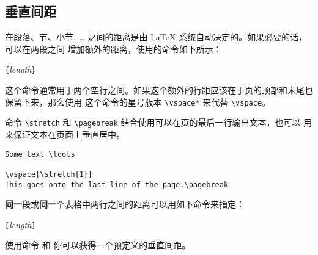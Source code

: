\subsection{垂直间距}
在段落、节、小节…… 之间的距离是由 \LaTeX{} 系统自动决定的。如果必要的话，可以在两段之间
增加额外的距离，使用的命令如下所示：
\begin{lscommand}
\verb|{|\emph{length}\verb|}|
\end{lscommand}

这个命令通常用于两个空行之间。如果这个额外的行距应该在于页的顶部和末尾也保留下来，那么使用
这个命令的星号版本 \verb|\vspace*| 来代替 \verb|\vspace|。

命令 \verb|\stretch| 和 \verb|\pagebreak| 结合使用可以在页的最后一行输出文本，也可以
用来保证文本在页面上垂直居中。
\begin{code}
\begin{verbatim}
Some text \ldots

\vspace{\stretch{1}}
This goes onto the last line of the page.\pagebreak
\end{verbatim}
\end{code}

\textbf{同一}段或\textbf{同一}个表格中两行之间的距离可以用如下命令来指定：
\begin{lscommand}
\ci{\bs}\verb|[|\emph{length}\verb|]|
\end{lscommand}

使用命令  和  你可以获得一个预定义的垂直间距。

